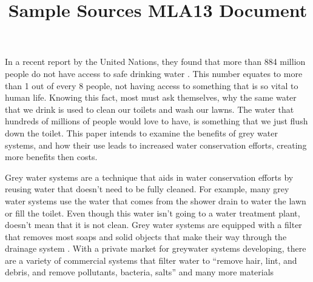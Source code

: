 \documentclass{article}
\title{Sample Sources MLA13 Document}
\begin{document}
\makeheader

In a recent report by the United Nations, they found that more than 884 million people do not have access to safe drinking water \cite[e.g.][15-23]{unWater}. This number equates to more than 1 out of every 8 people, not having access to something that is so vital to human life. Knowing this fact, most must ask themselves, why the same water that we drink is used to clean our toilets and wash our lawns. The water that hundreds of millions of people would love to have, is something that we just flush down the toilet. This paper intends to examine the benefits of grey water systems, and how their use leads to increased water conservation efforts, creating more benefits then costs.

Grey water systems are a technique that aids in water conservation efforts by reusing water that doesn't need to be fully cleaned. For example, many grey water systems use the water that comes from the shower drain to water the lawn or fill the toilet. Even though this water isn't going to a water treatment plant, doesn't mean that it is not clean. Grey water systems are equipped with a filter that removes most soaps and solid objects that make their way through the drainage system \cite{planetArk}. With a private market for greywater systems developing, there are a variety of commercial systems that filter water to ``remove hair, lint, and debris, and remove pollutants, bacteria, salts'' and many more materials \cite{pacificInst2010}

\makeworkscited
\end{document}
